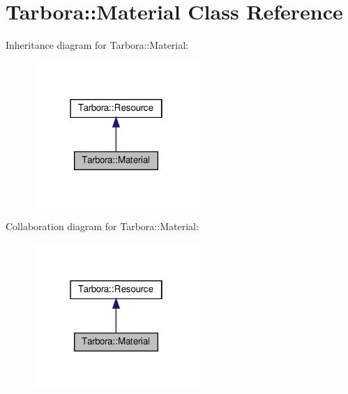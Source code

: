\hypertarget{classTarbora_1_1Material}{}\section{Tarbora\+:\+:Material Class Reference}
\label{classTarbora_1_1Material}


Inheritance diagram for Tarbora\+:\+:Material\+:
\nopagebreak
\begin{figure}[H]
\begin{center}
\leavevmode
\includegraphics[width=178pt]{classTarbora_1_1Material__inherit__graph}
\end{center}
\end{figure}


Collaboration diagram for Tarbora\+:\+:Material\+:
\nopagebreak
\begin{figure}[H]
\begin{center}
\leavevmode
\includegraphics[width=178pt]{classTarbora_1_1Material__coll__graph}
\end{center}
\end{figure}
